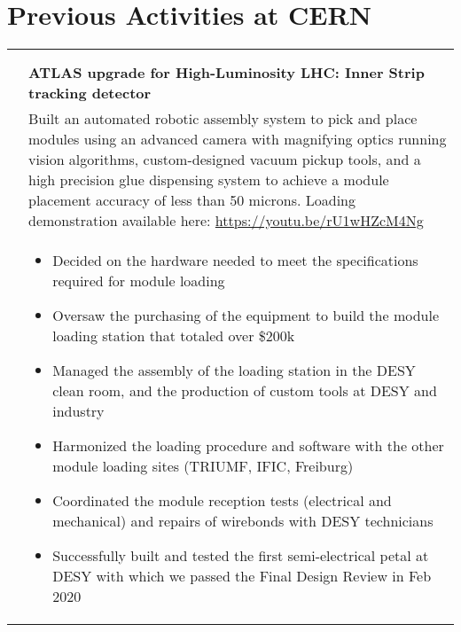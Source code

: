 \documentclass[a4paper,10pt]{article}
\begin{document}
\section{Previous Activities at CERN}
\begin{tabularx}{\textwidth}{>{\centering\arraybackslash}X p{} }
{\bf \large Upgrade} & \\
\vspace{1mm}  & \vspace{1mm} \\ 
 {\sl 2017--2020}  &   \textbf{ATLAS upgrade for High-Luminosity LHC: Inner Strip tracking detector} \\
  & Built an automated robotic assembly system to pick and place modules using an advanced camera with magnifying optics running vision algorithms, custom-designed vacuum pickup tools, and a high precision glue dispensing system to achieve a module placement accuracy of less than 50 microns. Loading demonstration available here: \href{https://youtu.be/rU1wHZcM4Ng}{https://youtu.be/rU1wHZcM4Ng} \\
      & \begin{itemize}
      \item Decided on the hardware needed to meet the specifications required for module loading
      \item Oversaw the purchasing of the equipment to build the module loading station that totaled over \$200k %
         \item Managed the assembly of the loading station in the DESY clean room, and the production of custom tools at DESY and industry
         \item Harmonized the loading procedure and software with the other module loading sites (TRIUMF, IFIC, Freiburg)
         \item Coordinated the module reception tests (electrical and mechanical) and repairs of wirebonds with DESY technicians
         \item Successfully built and tested the first semi-electrical petal at DESY with which we passed the Final Design Review in Feb 2020
       \end{itemize} \\[-1.5ex]


\end{tabularx}
\end{document}
